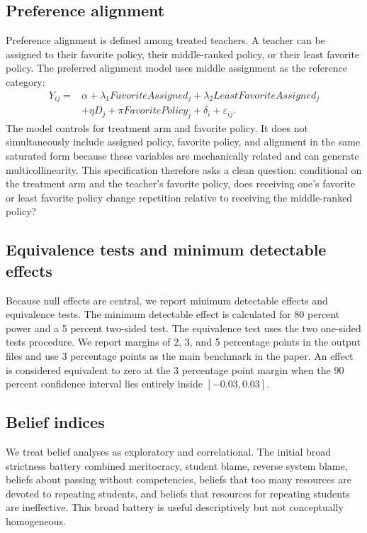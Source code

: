 \documentclass[12pt,a4paper]{article}
\begin{document}
\subsection{Preference alignment}

Preference alignment is defined among treated teachers. A teacher can be assigned to their favorite policy, their middle-ranked policy, or their least favorite policy. The preferred alignment model uses middle assignment as the reference category:
\[
\begin{aligned}
Y_{ij}={}&\alpha+\lambda_1 FavoriteAssigned_j+\lambda_2 LeastFavoriteAssigned_j\\
&+\eta D_j+\pi FavoritePolicy_j+\delta_i+\varepsilon_{ij}.
\end{aligned}
\]
The model controls for treatment arm and favorite policy. It does not simultaneously include assigned policy, favorite policy, and alignment in the same saturated form because these variables are mechanically related and can generate multicollinearity. This specification therefore asks a clean question: conditional on the treatment arm and the teacher's favorite policy, does receiving one's favorite or least favorite policy change repetition relative to receiving the middle-ranked policy?

\subsection{Equivalence tests and minimum detectable effects}

Because null effects are central, we report minimum detectable effects and equivalence tests. The minimum detectable effect is calculated for 80 percent power and a 5 percent two-sided test. The equivalence test uses the two one-sided tests procedure. We report margins of 2, 3, and 5 percentage points in the output files and use 3 percentage points as the main benchmark in the paper. An effect is considered equivalent to zero at the 3 percentage point margin when the 90 percent confidence interval lies entirely inside \([-0.03,0.03]\).

\subsection{Belief indices}

We treat belief analyses as exploratory and correlational. The initial broad strictness battery combined meritocracy, student blame, reverse system blame, beliefs about passing without competencies, beliefs that too many resources are devoted to repeating students, and beliefs that resources for repeating students are ineffective. This broad battery is useful descriptively but not conceptually homogeneous.
\end{document}
